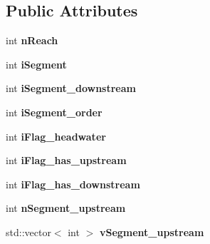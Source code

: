 \subsection*{Public Attributes}
\begin{DoxyCompactItemize}
\item 
\hypertarget{classhexwatershed_1_1segment_a9115344c54333df599c6d14cc14caf29}{int {\bfseries n\-Reach}}\label{classhexwatershed_1_1segment_a9115344c54333df599c6d14cc14caf29}

\item 
\hypertarget{classhexwatershed_1_1segment_ae39d97817c7a2e1a362f3d425d060522}{int {\bfseries i\-Segment}}\label{classhexwatershed_1_1segment_ae39d97817c7a2e1a362f3d425d060522}

\item 
\hypertarget{classhexwatershed_1_1segment_a55819810ead509866cf5487ea743214a}{int {\bfseries i\-Segment\-\_\-downstream}}\label{classhexwatershed_1_1segment_a55819810ead509866cf5487ea743214a}

\item 
\hypertarget{classhexwatershed_1_1segment_a2d26dfcbee67b2a7e8cff0800967585c}{int {\bfseries i\-Segment\-\_\-order}}\label{classhexwatershed_1_1segment_a2d26dfcbee67b2a7e8cff0800967585c}

\item 
\hypertarget{classhexwatershed_1_1segment_ad1f98a6311bc0431f225a78527f3d74f}{int {\bfseries i\-Flag\-\_\-headwater}}\label{classhexwatershed_1_1segment_ad1f98a6311bc0431f225a78527f3d74f}

\item 
\hypertarget{classhexwatershed_1_1segment_aa66f1c654fe5c5ed5de764680ace6a4b}{int {\bfseries i\-Flag\-\_\-has\-\_\-upstream}}\label{classhexwatershed_1_1segment_aa66f1c654fe5c5ed5de764680ace6a4b}

\item 
\hypertarget{classhexwatershed_1_1segment_a3359788cdb16f704cee42480e73efb82}{int {\bfseries i\-Flag\-\_\-has\-\_\-downstream}}\label{classhexwatershed_1_1segment_a3359788cdb16f704cee42480e73efb82}

\item 
\hypertarget{classhexwatershed_1_1segment_a0658a0988d360f55942787f8b99096e6}{int {\bfseries n\-Segment\-\_\-upstream}}\label{classhexwatershed_1_1segment_a0658a0988d360f55942787f8b99096e6}

\item 
\hypertarget{classhexwatershed_1_1segment_aa318d66f1d6a6d0f7022ad3b4e1485c8}{std\-::vector$<$ int $>$ {\bfseries v\-Segment\-\_\-upstream}}\label{classhexwatershed_1_1segment_aa318d66f1d6a6d0f7022ad3b4e1485c8}


\end{DoxyCompactItemize}
